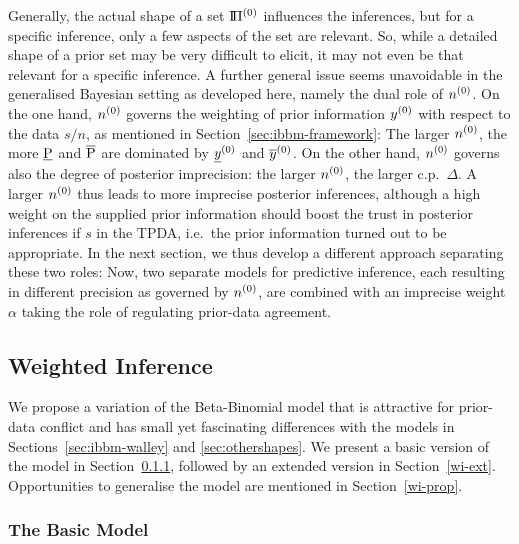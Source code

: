 Generally, the actual shape of a set $\text{I}\!\Pi^{(0)}$ influences the inferences,
but for a specific inference, only a few aspects of the set are relevant. So, while
a detailed shape of a prior set may be very difficult to elicit, it may not
even be that relevant for a specific inference. A further general issue seems unavoidable in the
generalised Bayesian setting as developed here, namely the dual role of $n^{(0)}$. On the one
hand, $n^{(0)}$ governs the weighting of prior information $y^{(0)}$ with
respect to the data $s/n$, as mentioned in
Section~\ref{sec:ibbm-framework}: The larger $n^{(0)}$, the more
$\underline{\operatorname{P}}$ and $\overline{\operatorname{P}}$ are dominated by $\underline{y}^{(0)}$ and $\overline{y}^{(0)}$. On
the other hand, $n^{(0)}$ governs also the degree of posterior
imprecision: the larger $n^{(0)}$, the larger c.p.\ $\Delta$. A larger
$n^{(0)}$ thus leads to more imprecise posterior inferences, although a
high weight on the supplied prior information should boost the trust
in posterior inferences if $s$ in the TPDA, i.e.\ the prior
information turned out to be appropriate. In the next section,
we thus develop a different approach separating these two
roles: Now, two separate models for predictive inference, each
resulting in different precision as governed by $n^{(0)}$,
are combined with an imprecise weight $\alpha$ %
taking the role of regulating prior-data agreement.


\subsection{Weighted Inference}
\label{sec:weightedinf}

We propose a variation of the Beta-Binomial model
that is attractive for prior-data conflict
and has small yet fascinating differences with the models in
Sections~\ref{sec:ibbm-walley} and \ref{sec:othershapes}. We present a basic
version of the model in Section~\ref{wi-basic}, followed by an
extended version in Section~\ref{wi-ext}. Opportunities to
generalise the model are mentioned in
Section~\ref{wi-prop}.


\subsubsection{The Basic Model}
\label{wi-basic}

